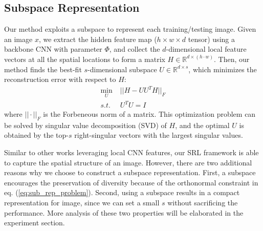 \subsection{Subspace Representation}
Our method exploits a subspace to represent each training/testing image.
Given an image $x$, we extract the hidden feature map ($h \times w \times d$ tensor) using a backbone CNN with parameter $\Phi$, and collect the $d$-dimensional local feature vectors at all the spatial locations to form a matrix $H \in \mathbb{R}^{d \times (h \cdot w)}$.
Then, our method finds the best-fit $s$-dimensional subspace $U \in \mathbb{R}^{d \times s}$, which minimizes the reconstruction error with respect to $H$:
\begin{equation}
\begin{split}
    \min_{U}\; &||H - UU^TH||_F \\
    s.t. \;& U^TU = I
\end{split}
\label{eq:sub_rep_problem}
\end{equation}
where $||\cdot||_F$ is the Forbeneous norm of a matrix.
This optimization problem can be solved by singular value decomposition (SVD) of $H$, and the optimal $U$ is obtained by the top-$s$ right-singular vectors with the largest singular values.

Similar to other works \cite{li2019revisiting,zhang2020deepemd} leveraging local CNN features, our SRL framework is able to capture the spatial structure of an image.
However, there are two additional reasons why we choose to construct a  subspace representation.
First, a subspace encourages the preservation of diversity because of the orthonormal constraint in eq. (\ref{eq:sub_rep_problem}).
Second, using a subspace results in a compact representation for image, since we can set a small $s$ without sacrificing the performance.
More analysis of these two properties will be elaborated in the experiment section.


